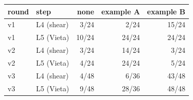 \begin{tabular}{l l rrr}
\toprule
round & step & none & example A & example B \\
\midrule
v1 & L4 (shear) & 3/24 & 2/24 & 15/24 \\
v1 & L5 (Vieta) & 10/24 & 24/24 & 24/24 \\
\midrule
v2 & L4 (shear) & 3/24 & 14/24 & 3/24 \\
v2 & L5 (Vieta) & 4/24 & 24/24 & 5/24 \\
\midrule
v3 & L4 (shear) & 4/48 & 6/36 & 43/48 \\
v3 & L5 (Vieta) & 9/48 & 28/36 & 48/48 \\
\bottomrule
\end{tabular}
